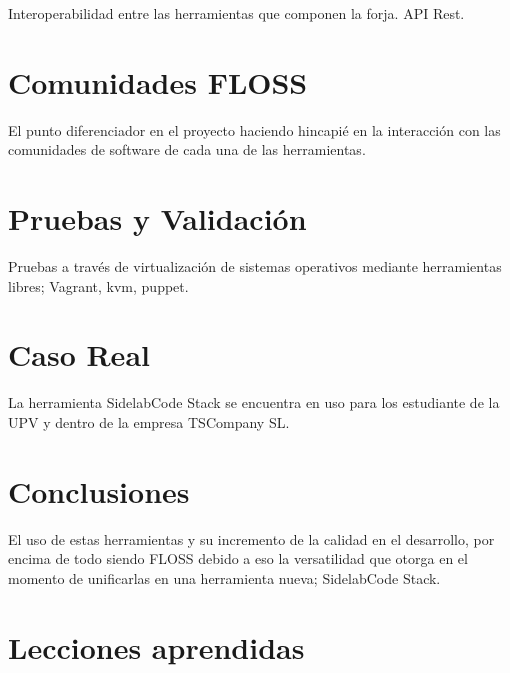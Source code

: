 \documentclass[11pt]{scrartcl}
\begin{document}
\par Interoperabilidad entre las herramientas que componen la forja. API Rest.



\section{Comunidades FLOSS}
\label{sec:comunidades}

\par El punto diferenciador en el proyecto haciendo hincapi\'e en la interacci\'on con las comunidades de software de cada una de las herramientas.


\section{Pruebas y Validaci\'on}
\label{sec:pruebas}

\par Pruebas a través de virtualizaci\'on de sistemas operativos mediante herramientas libres; Vagrant, kvm, puppet.


\section{Caso Real}
\label{sec:casoreal}

\par La herramienta SidelabCode Stack se encuentra en uso para los estudiante de la UPV y dentro de la empresa TSCompany SL.


\section{Conclusiones}
\label{sec:conclusiones}

\par El uso de estas herramientas y su incremento de la calidad en el desarrollo, por encima de todo siendo FLOSS debido a eso la versatilidad que otorga en el momento de unificarlas en una herramienta nueva; SidelabCode Stack.


\section{Lecciones aprendidas}
\label{sec:lecciones}
\end{document}

